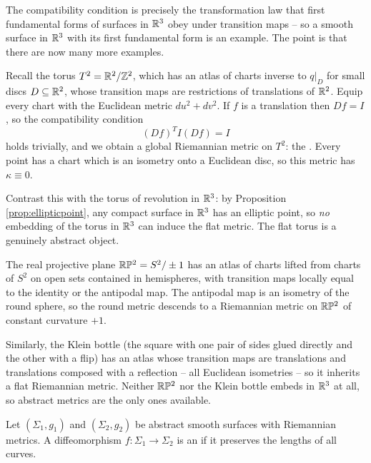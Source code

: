 \documentclass[a4paper]{scrartcl}
\begin{document}
The compatibility condition is precisely the transformation law that first fundamental forms of surfaces in $\mathbb{R}^3$ obey under transition maps -- so a smooth surface in $\mathbb{R}^3$ with its first fundamental form is an example. The point is that there are now many more examples.

\begin{example}\label{ex:flattorus}
    Recall the torus $T^2 = \mathbb{R}^2/\mathbb{Z}^2$, which has an atlas of charts inverse to $q|_{D}$ for small discs $D \subseteq \mathbb{R}^2$, whose transition maps are restrictions of translations of $\mathbb{R}^2$. Equip every chart with the Euclidean metric $du^2 + dv^2$. If $f$ is a translation then $Df = I$, so the compatibility condition
    $$
    (Df)^T I (Df) = I
    $$
    holds trivially, and we obtain a global Riemannian metric on $T^2$: the . Every point has a chart which is an isometry onto a Euclidean disc, so this metric has $\kappa \equiv 0$.

    Contrast this with the torus of revolution in $\mathbb{R}^3$: by Proposition \ref{prop:ellipticpoint}, any compact surface in $\mathbb{R}^3$ has an elliptic point, so \emph{no} embedding of the torus in $\mathbb{R}^3$ can induce the flat metric. The flat torus is a genuinely abstract object.
\end{example}

\begin{example}
    The real projective plane $\mathbb{R}\mathbb{P}^2 = S^2/\pm 1$ has an atlas of charts lifted from charts of $S^2$ on open sets contained in hemispheres, with transition maps locally equal to the identity or the antipodal map. The antipodal map is an isometry of the round sphere, so the round metric descends to a Riemannian metric on $\mathbb{R}\mathbb{P}^2$ of constant curvature $+1$.

    Similarly, the Klein bottle (the square with one pair of sides glued directly and the other with a flip) has an atlas whose transition maps are translations and translations composed with a reflection -- all Euclidean isometries -- so it inherits a flat Riemannian metric. Neither $\mathbb{R}\mathbb{P}^2$ nor the Klein bottle embeds in $\mathbb{R}^3$ at all, so abstract metrics are the only ones available.
\end{example}

\begin{definition}
    Let $(\Sigma_1, g_1)$ and $(\Sigma_2, g_2)$ be abstract smooth surfaces with Riemannian metrics. A diffeomorphism $f: \Sigma_1 \rightarrow \Sigma_2$ is an  if it preserves the lengths of all curves.
\end{definition}
\end{document}
